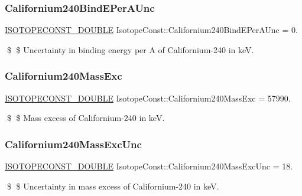 \subsubsection{\texorpdfstring{Californium240\+Bind\+E\+Per\+A\+Unc}{Californium240BindEPerAUnc}}
{\footnotesize\ttfamily \mbox{\hyperlink{group___isotope_const-_macros_ga8f45a7272ce02c0b4c65c44636ed719a}{I\+S\+O\+T\+O\+P\+E\+C\+O\+N\+S\+T\+\_\+\+D\+O\+U\+B\+LE}} Isotope\+Const\+::\+Californium240\+Bind\+E\+Per\+A\+Unc = 0.}

\$ \$ Uncertainty in binding energy per A of Californium-\/240 in keV. \mbox{\label{group___isotope_const-_californium-_cf240_ga1e85418ad4928e6fb75eae97ebea9a02}} 
\subsubsection{\texorpdfstring{Californium240\+Mass\+Exc}{Californium240MassExc}}
{\footnotesize\ttfamily \mbox{\hyperlink{group___isotope_const-_macros_ga8f45a7272ce02c0b4c65c44636ed719a}{I\+S\+O\+T\+O\+P\+E\+C\+O\+N\+S\+T\+\_\+\+D\+O\+U\+B\+LE}} Isotope\+Const\+::\+Californium240\+Mass\+Exc = 57990.}

\$ \$ Mass excess of Californium-\/240 in keV. \mbox{\label{group___isotope_const-_californium-_cf240_gab83c94ef18b20d25e41944f1ff8c3b27}} 
\subsubsection{\texorpdfstring{Californium240\+Mass\+Exc\+Unc}{Californium240MassExcUnc}}
{\footnotesize\ttfamily \mbox{\hyperlink{group___isotope_const-_macros_ga8f45a7272ce02c0b4c65c44636ed719a}{I\+S\+O\+T\+O\+P\+E\+C\+O\+N\+S\+T\+\_\+\+D\+O\+U\+B\+LE}} Isotope\+Const\+::\+Californium240\+Mass\+Exc\+Unc = 18.}

\$ \$ Uncertainty in mass excess of Californium-\/240 in keV. \mbox{\label{group___isotope_const-_californium-_cf240_ga4916f5ae80176eed703cdb8b3a03922d}} 

